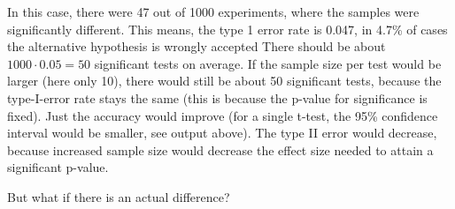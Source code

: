 \documentclass{article}
\begin{document}
In this case, there were 47 out of 1000 experiments, where the samples were significantly different. This means, the type 1 error rate is 0.047, in 4.7\% of cases the alternative hypothesis is wrongly accepted There should be about $1000\cdot 0.05 = 50$ significant tests on average. If the sample size per test would be larger (here only 10), there would still be about 50 significant tests, because the type-I-error rate stays the same (this is because the p-value for significance is fixed). Just the accuracy would improve (for a single t-test, the 95\% confidence interval would be smaller, see output above). The type II error would decrease, because increased sample size would decrease the effect size needed to attain a significant p-value.\par
But what if there is an actual difference?
\end{document}
